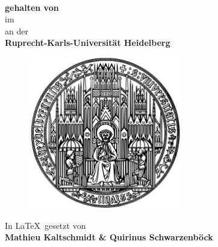 
\begin{titlepage}
	\begin{center}
		\makeatletter
		
		\thispagestyle{empty}
		
		\Huge\textbf{\@title} \\
		\vspace{5mm}
		\Large\textbf{ gehalten von \@author} \\
		\large{im \@date} \\
		\vspace{5mm}
		\large{an der} \\
		\Large\textbf{Ruprecht-Karls-Universität Heidelberg} \\
		\vfill
		\begin{figure}[H]
			\centering
			\includegraphics*[width=0.6\textwidth]{figures/logo-uni-hd-small}
		\end{figure}
	    \vfill
		\Large
		In \LaTeX \ gesetzt von \\ 
		\vspace{3mm}
		\bfseries{
		Mathieu Kaltschmidt
		\& 
		Quirinus Schwarzenböck}\\ 	
		\makeatother
	\end{center}
\blankpage
\end{titlepage}

